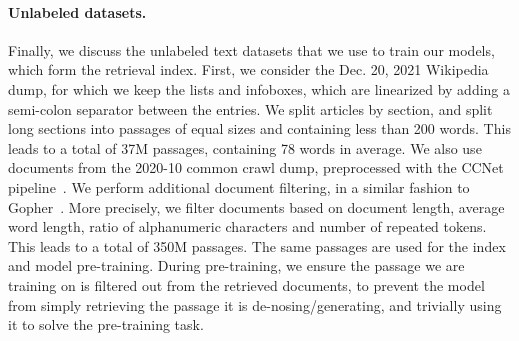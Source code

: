 \documentclass[10pt]{article} \usepackage[preprint]{tmlr}
\begin{document}
\paragraph{Unlabeled datasets.}
Finally, we discuss the unlabeled text datasets that we use to train our models, which form the retrieval index.
First, we consider the Dec. 20, 2021 Wikipedia dump, for which we keep the lists and infoboxes, which are linearized by adding a semi-colon separator between the entries.
We split articles by section, and split long sections into passages of equal sizes and containing less than 200 words.
This leads to a total of 37M passages, containing 78 words in average.
We also use documents from the 2020-10 common crawl dump, preprocessed with the CCNet pipeline~\citep{wenzek-etal-2020-ccnet}.
We perform additional document filtering, in a similar fashion to Gopher~\citep{rae2021goepher}.
More precisely, we filter documents based on document length, average word length, ratio of alphanumeric characters and number of repeated tokens.
This leads to a total of 350M passages.
The same passages are used for the index and model pre-training.
During pre-training, we ensure the passage we are training on is filtered out from the retrieved documents, to prevent the model from simply retrieving the passage it is de-nosing/generating, and trivially using it to solve the pre-training task.
\end{document}
